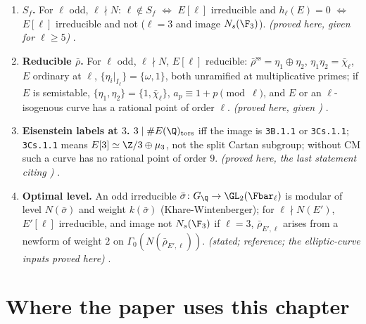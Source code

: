 \begin{enumerate}[label=\textbf{\thechapter.\arabic*}]
potentially multiplicative $p\ne3$ has $3\mid v_p(j)$; no $p\ne3$ has type $\kod{IV}$, $\kod{IV}^*$ and no $p\ge5$ type $\kod{II}$, $\kod{II}^*$; the
set $R$ of primes $p\ne3$ with $\rho_{E,3}(I_p)$ cyclic of order $4$ is nonempty and is the set of primes $p\ne3$ ramified in either quadratic
field of $\psi_3$; for $p\in R$, $\Frob_p$ acts on $(\ad V)^{I_p}$ by $\chi_{-3}(p)$ and $e_3(E,p)=v_3(p-\chi_{-3}(p))\ge1$; if $p\in R$, $p\ge5$, the type is
$\kod{III}$ or $\kod{III}^*$ and $p\equiv\pm1\pmod{12}$. \emph{(proved here)} .
\item \textbf{$S_f$.} For $\ell$ odd, $\ell\nmid N$: $\ell\notin S_f$ $\iff$ $E[\ell]$ irreducible and $h_\ell(E)=0$ $\iff$ $E[\ell]$ irreducible and not
($\ell=3$ and image $N_s(\F_3)$). \emph{(proved here, given  for $\ell\ge5$)} .
\item \textbf{Reducible $\bar\rho$.} For $\ell$ odd, $\ell\nmid N$, $E[\ell]$ reducible: $\bar\rho^{\mathrm{ss}}=\eta_1\oplus\eta_2$, $\eta_1\eta_2=\bar\chi_\ell$, $E$ ordinary
at $\ell$, $\{\eta_i|_{I_\ell}\}=\{\omega,1\}$, both unramified at multiplicative primes; if $E$ is semistable, $\{\eta_1,\eta_2\}=\{1,\bar\chi_\ell\}$,
$a_p\equiv1+p\pmod\ell$, and $E$ or an $\ell$-isogenous curve has a rational point of order $\ell$. \emph{(proved here, given
)}
.
\item \textbf{Eisenstein labels at $3$.} $3\mid\#E(\Q)_{\mathrm{tors}}$ iff the image is \texttt{3B.1.1} or \texttt{3Cs.1.1}; \texttt{3Cs.1.1} means
$E[3]\simeq\Z/3\oplus\mu_3$, not the split Cartan subgroup; without CM such a curve has no rational point of order $9$. \emph{(proved here,
the last statement citing )} .
\item \textbf{Optimal level.} An odd irreducible $\bar\sigma\colon G_\Q\to\GL_2(\Fbar_\ell)$ is modular of level $N(\bar\sigma)$ and weight $k(\bar\sigma)$
(Khare-Wintenberger); for $\ell\nmid N(E')$, $E'[\ell]$ irreducible, and image not $N_s(\F_3)$ if $\ell=3$, $\bar\rho_{E',\ell}$ arises from a newform of
weight $2$ on $\Gamma_0(N(\bar\rho_{E',\ell}))$. \emph{(stated; reference; the elliptic-curve inputs proved here)}
.
\end{enumerate}

\section*{Where the paper uses this chapter}


